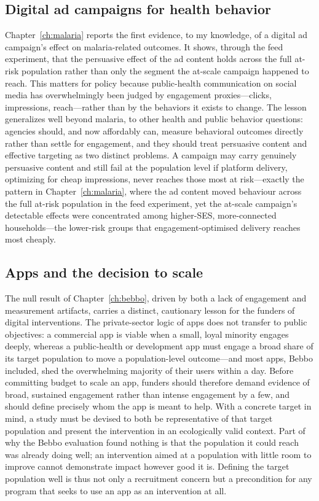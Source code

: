 \subsection{Digital ad campaigns for health behavior}

Chapter~\ref{ch:malaria} reports the first evidence, to my knowledge, of a digital ad campaign's effect on malaria-related outcomes. It shows, through the feed experiment, that the persuasive effect of the ad content holds across the full at-risk population rather than only the segment the at-scale campaign happened to reach. This matters for policy because public-health communication on social media has overwhelmingly been judged by engagement proxies---clicks, impressions, reach---rather than by the behaviors it exists to change. The lesson generalizes well beyond malaria, to other health and public behavior questions: agencies should, and now affordably can, measure behavioral outcomes directly rather than settle for engagement, and they should treat persuasive content and effective targeting as two distinct problems. A campaign may carry genuinely persuasive content and still fail at the population level if platform delivery, optimizing for cheap impressions, never reaches those most at risk---exactly the pattern in Chapter~\ref{ch:malaria}, where the ad content moved behaviour across the full at-risk population in the feed experiment, yet the at-scale campaign's detectable effects were concentrated among higher-SES, more-connected households---the lower-risk groups that engagement-optimised delivery reaches most cheaply.

\subsection{Apps and the decision to scale}

The null result of Chapter~\ref{ch:bebbo}, driven by both a lack of engagement and measurement artifacts, carries a distinct, cautionary lesson for the funders of digital interventions. The private-sector logic of apps does not transfer to public objectives: a commercial app is viable when a small, loyal minority engages deeply, whereas a public-health or development app must engage a broad share of its target population to move a population-level outcome---and most apps, Bebbo included, shed the overwhelming majority of their users within a day. Before committing budget to scale an app, funders should therefore demand evidence of broad, sustained engagement rather than intense engagement by a few, and should define precisely whom the app is meant to help. With a concrete target in mind, a study must be devised to both be representative of that target population and present the intervention in an ecologically valid context. Part of why the Bebbo evaluation found nothing is that the population it could reach was already doing well; an intervention aimed at a population with little room to improve cannot demonstrate impact however good it is. Defining the target population well is thus not only a recruitment concern but a precondition for any program that seeks to use an app as an intervention at all.


